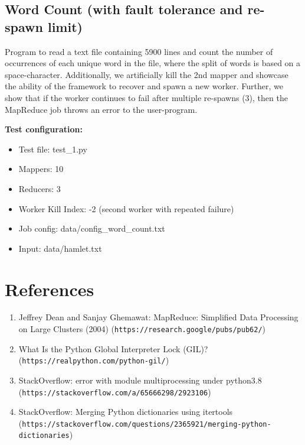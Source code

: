 \documentclass[a4paper,12pt]{article}
\begin{document}
\subsection{Word Count \textbf{(with fault tolerance and re-spawn limit)}}
Program to read a text file containing 5900 lines and count the number of occurrences of each unique word in the file, where the split of words is based on a space-character. Additionally, we artificially kill the 2nd mapper and showcase the ability of the framework to recover and spawn a new worker. Further, we show that if the worker continues to fail after multiple re-spawns (3), then the MapReduce job throws an error to the user-program. \newline

\textbf{Test configuration:}
\begin{itemize}
    \item Test file: test\_1.py
    \item Mappers: 10
    \item Reducers: 3
    \item Worker Kill Index: -2 (second worker with repeated failure)
    \item Job config: data/config\_word\_count.txt
    \item Input: data/hamlet.txt
\end{itemize}

\section{References}
\begin{enumerate}
    \item Jeffrey Dean and Sanjay Ghemawat: MapReduce: Simplified Data Processing on Large Clusters (2004) (\nolinkurl{https://research.google/pubs/pub62/})
    \item What Is the Python Global Interpreter Lock (GIL)? (\nolinkurl{https://realpython.com/python-gil/})
    \item StackOverflow: error with module multiprocessing under python3.8 (\nolinkurl{https://stackoverflow.com/a/65666298/2923106})
    \item StackOverflow: Merging Python dictionaries using itertools (\nolinkurl{https://stackoverflow.com/questions/2365921/merging-python-dictionaries})
\end{enumerate}
\end{document}

